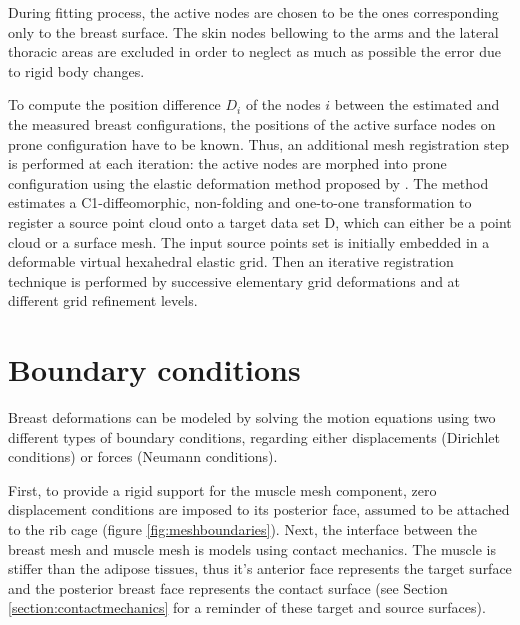 During fitting process, the active nodes are chosen to be the ones corresponding only to the breast surface. The skin nodes bellowing to the  arms and the lateral thoracic areas are excluded  in order to neglect as much as possible the error due to rigid body changes.

To compute the position difference $D_i$ of the nodes $i$ between the estimated and the measured breast configurations, the  positions of the active surface nodes on prone configuration have to be known. Thus, an additional mesh registration step is performed at each iteration: the active nodes are morphed into prone configuration using the elastic deformation method proposed by \cite{bucki_fast_2010}. The method estimates a C1-diffeomorphic, non-folding and one-to-one transformation to register a source point cloud onto a target data set D, which can either be a point cloud or a surface mesh.  The input source points set is initially embedded in a deformable virtual hexahedral elastic grid. Then an iterative registration technique is performed by successive elementary grid deformations and at different grid refinement levels. 


\section{Boundary conditions}\label{section:myBoundayconditions}

Breast deformations can be modeled by solving the
motion equations using two different types of boundary
conditions, regarding either displacements (Dirichlet conditions) or forces (Neumann conditions).

First, to provide a rigid support for the muscle mesh component, zero displacement conditions are imposed to its posterior face, assumed to be attached to the rib cage (figure \ref{fig:meshboundaries}). Next, the interface between the breast mesh and muscle mesh is models using contact mechanics. The muscle is stiffer than the adipose tissues, thus it's anterior face represents the target surface and the posterior breast face represents the contact surface (see Section \ref{section:contactmechanics} for a reminder of these target and source surfaces). 

